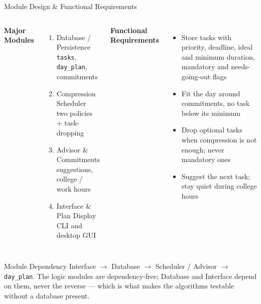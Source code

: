 \documentclass[aspectratio=169,11pt]{beamer}
\begin{document}
\begin{frame}{Module Design \& Functional Requirements}

\begin{columns}[T,totalwidth=\textwidth]


\textbf{\color{GEUBlue}Major Modules}

\begin{enumerate}\itemsep3pt
\scriptsize
\item Database / Persistence\\
      {\color{GEUGrey}\texttt{tasks}, \texttt{day\_plan}, commitments}
\item Compression Scheduler\\
      {\color{GEUGrey}two policies + task-dropping}
\item Advisor \& Commitments\\
      {\color{GEUGrey}suggestions, college / work hours}
\item Interface \& Plan Display\\
      {\color{GEUGrey}CLI and desktop GUI}
\end{enumerate}


\textbf{\color{GEUBlue}Functional Requirements}

\begin{itemize}\itemsep3pt
\scriptsize
\item Store tasks with priority, deadline, ideal and minimum duration,
      mandatory and needs-going-out flags
\item Fit the day around commitments, no task below its minimum
\item Drop optional tasks when compression is not enough; never mandatory
      ones
\item Suggest the next task; stay quiet during college hours
\end{itemize}

\end{columns}

\vfill

\begin{block}{Module Dependency}
\scriptsize
Interface $\rightarrow$ Database $\rightarrow$ Scheduler / Advisor $\rightarrow$
\texttt{day\_plan}. The logic modules are dependency-free; Database and Interface
depend on them, never the reverse --- which is what makes the algorithms
testable without a database present.
\end{block}

\end{frame}
\end{document}
